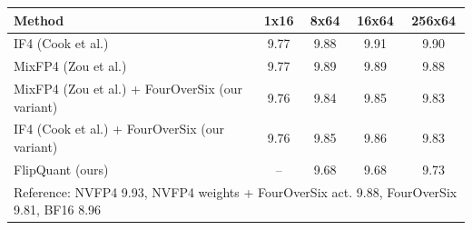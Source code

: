 \begin{tabular}{lcccc}
\toprule
Method & 1x16 & 8x64 & 16x64 & 256x64 \\
\midrule
IF4 (Cook et al.) & 9.77 & 9.88 & 9.91 & 9.90 \\
MixFP4 (Zou et al.) & 9.77 & 9.89 & 9.89 & 9.88 \\
MixFP4 (Zou et al.) + FourOverSix (our variant) & 9.76 & 9.84 & 9.85 & 9.83 \\
IF4 (Cook et al.) + FourOverSix (our variant) & 9.76 & 9.85 & 9.86 & 9.83 \\
FlipQuant (ours) & -- & 9.68 & 9.68 & 9.73 \\
\midrule
\multicolumn{5}{l}{\footnotesize Reference: NVFP4 9.93, NVFP4 weights + FourOverSix act. 9.88, FourOverSix 9.81, BF16 8.96} \\
\bottomrule
\end{tabular}
